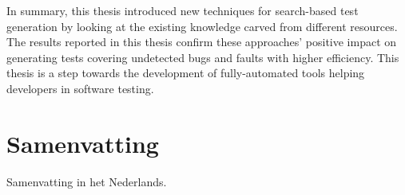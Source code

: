 In summary, this thesis introduced new techniques for search-based test generation by looking at the existing knowledge carved from different resources. The results reported in this thesis confirm these approaches' positive impact on generating tests covering undetected bugs and faults with higher efficiency. This thesis is a step towards the development of fully-automated tools helping developers in software testing.
\chapter*{Samenvatting}

{

  Samenvatting in het Nederlands.
}



